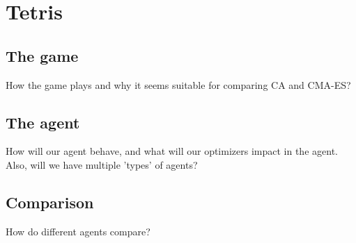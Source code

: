 \section{Tetris}

\subsection{The game}

How the game plays and why it seems suitable for 
comparing CA and CMA-ES?

\subsection{The agent}

How will our agent behave, and what will our optimizers impact 
in the agent. Also, will we have multiple 'types' of agents?

\subsection{Comparison}

How do different agents compare?
